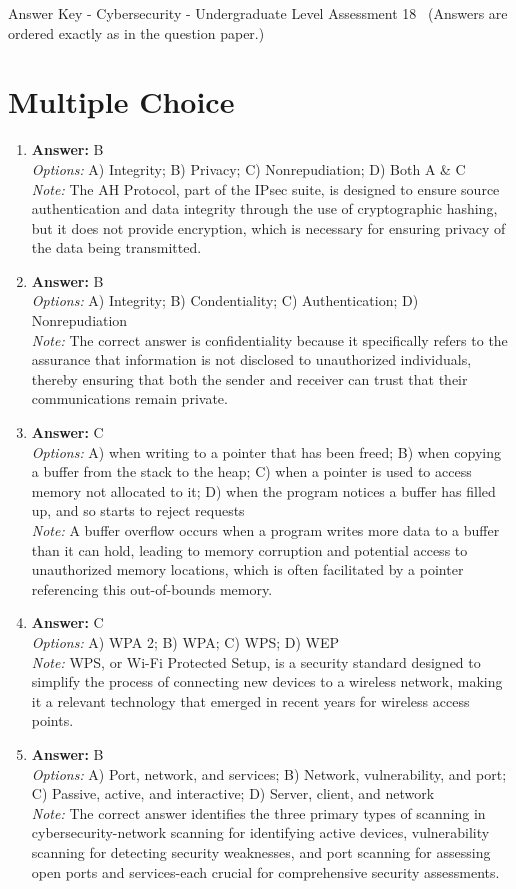 \documentclass[12pt]{article}
\begin{document}
\begin{center}
Answer Key - Cybersecurity - Undergraduate Level Assessment 18 \
\small (Answers are ordered exactly as in the question paper.)
\end{center}

\section*{Multiple Choice}
\begin{enumerate}[label=\arabic*.]
\item \textbf{Answer:} B
\\ \textit{Options:} A) Integrity; B) Privacy; C) Nonrepudiation; D) Both A \& C
\\ \textit{Note:} The AH Protocol, part of the IPsec suite, is designed to ensure source authentication and data integrity through the use of cryptographic hashing, but it does not provide encryption, which is necessary for ensuring privacy of the data being transmitted.
\item \textbf{Answer:} B
\\ \textit{Options:} A) Integrity; B) Condentiality; C) Authentication; D) Nonrepudiation
\\ \textit{Note:} The correct answer is confidentiality because it specifically refers to the assurance that information is not disclosed to unauthorized individuals, thereby ensuring that both the sender and receiver can trust that their communications remain private.
\item \textbf{Answer:} C
\\ \textit{Options:} A) when writing to a pointer that has been freed; B) when copying a buffer from the stack to the heap; C) when a pointer is used to access memory not allocated to it; D) when the program notices a buffer has filled up, and so starts to reject requests
\\ \textit{Note:} A buffer overflow occurs when a program writes more data to a buffer than it can hold, leading to memory corruption and potential access to unauthorized memory locations, which is often facilitated by a pointer referencing this out-of-bounds memory.
\item \textbf{Answer:} C
\\ \textit{Options:} A) WPA 2; B) WPA; C) WPS; D) WEP
\\ \textit{Note:} WPS, or Wi-Fi Protected Setup, is a security standard designed to simplify the process of connecting new devices to a wireless network, making it a relevant technology that emerged in recent years for wireless access points.
\item \textbf{Answer:} B
\\ \textit{Options:} A) Port, network, and services; B) Network, vulnerability, and port; C) Passive, active, and interactive; D) Server, client, and network
\\ \textit{Note:} The correct answer identifies the three primary types of scanning in cybersecurity-network scanning for identifying active devices, vulnerability scanning for detecting security weaknesses, and port scanning for assessing open ports and services-each crucial for comprehensive security assessments.
\end{enumerate}
\end{document}
